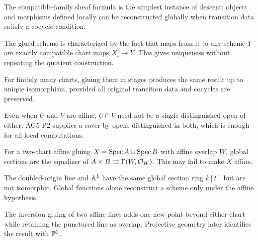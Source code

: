 \begin{example}
The compatible-family sheaf formula is the simplest instance of descent: objects and morphisms defined locally can be reconstructed globally when transition data satisfy a cocycle condition.
\end{example}

\begin{example}
The glued scheme is characterized by the fact that maps from it to any scheme $Y$ are exactly compatible chart maps $X_i\to Y$.  This gives uniqueness without repeating the quotient construction.
\end{example}

\begin{example}
For finitely many charts, gluing them in stages produces the same result up to unique isomorphism, provided all original transition data and cocycles are preserved.
\end{example}

\begin{example}
Even when $U$ and $V$ are affine, $U\cap V$ need not be a single distinguished open of either.  AG5-P2 supplies a cover by opens distinguished in both, which is enough for all local computations.
\end{example}

\begin{example}
For a two-chart affine gluing $X=\operatorname{Spec} A\cup\operatorname{Spec} B$ with affine overlap $W$, global sections are the equalizer of $A\times B\rightrightarrows\Gamma(W,\mathcal O_W)$.  This may fail to make $X$ affine.
\end{example}

\begin{example}
The doubled-origin line and $\mathbb A^1$ have the same global section ring $k[t]$ but are not isomorphic.  Global functions alone reconstruct a scheme only under the affine hypothesis.
\end{example}

\begin{example}
The inversion gluing of two affine lines adds one new point beyond either chart while retaining the punctured line as overlap.  Projective geometry later identifies the result with $\mathbb P^1$.
\end{example}

